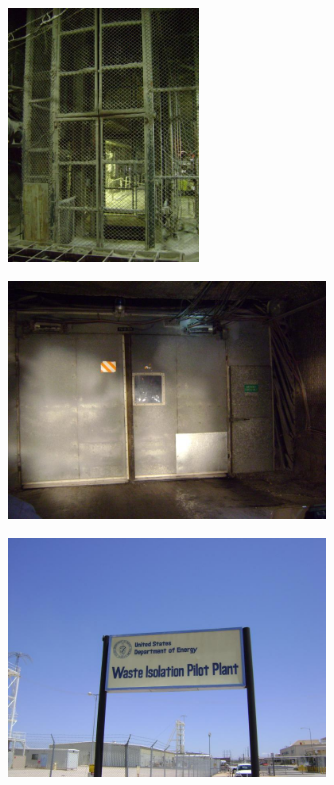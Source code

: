 \documentclass[aspectratio=1610,pdftex,dvipsnames,compress,xcolor={dvipsnames}]{beamer}
\begin{document}
\begin{frame}{}
    \begin{figure}
        \centering
        \includegraphics[width=0.45\textwidth]{wipp1.jpg}
    \end{figure}
\end{frame}


\begin{frame}{}
    \begin{figure}
        \centering
        \includegraphics[width=0.75\textwidth]{wipp2.jpg}
    \end{figure}
\end{frame}


\begin{frame}{}
    \begin{figure}
        \centering
        \includegraphics[width=0.75\textwidth]{wipp3.jpg}
    \end{figure}
\end{frame}
\end{document}
